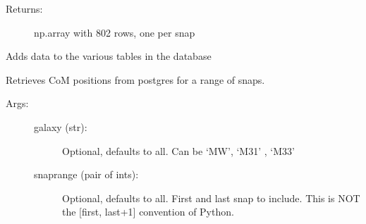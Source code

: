\documentclass[letterpaper,10pt,english]{sphinxmanual}
\begin{document}
\begin{fulllineitems}
\begin{fulllineitems}
\begin{description}
\item[{Returns:}] \leavevmode
np.array with 802 rows, one per snap

\end{description}

\end{fulllineitems}


\begin{fulllineitems}
\label{\detokenize{timecourse:galaxy.timecourse.TimeCourse.write_db_tables}}
Adds data to the various tables in the  database

\end{fulllineitems}


\begin{fulllineitems}
\label{\detokenize{timecourse:galaxy.timecourse.TimeCourse.read_com_db}}
Retrieves CoM positions from postgres for a range of snaps.
\begin{description}
\item[{Args:}] \leavevmode\begin{description}
\item[{galaxy (str):}] \leavevmode
Optional, defaults to all. Can be ‘MW’, ‘M31’ , ‘M33’

\item[{snaprange (pair of ints):}] \leavevmode
Optional, defaults to all. First and last snap to include.
This is NOT the {[}first, last+1{]} convention of Python.

\end{description}

\end{description}

\end{fulllineitems}


\end{fulllineitems}
\end{document}
